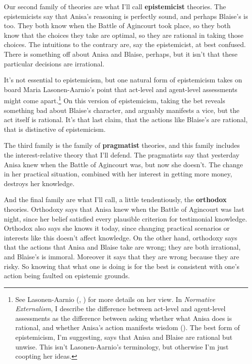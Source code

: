 \documentclass[
  12pt,
  letterpaper,
]{scrbook}
\begin{document}
Our second family of theories are what I'll call \textbf{epistemicist}
theories. The epistemicists say that Anisa's reasoning is perfectly
sound, and perhaps Blaise's is too. They both know when the Battle of
Agincourt took place, so they both know that the choices they take are
optimal, so they are rational in taking those choices. The intuitions to
the contrary are, say the epistemicist, at best confused. There is
something off about Anisa and Blaise, perhaps, but it isn't that these
particular decisions are irrational.

It's not essential to epistemicism, but one natural form of epistemicism
takes on board Maria Lasonen-Aarnio's point that act-level and
agent-level assessments might come apart.\footnote{See Lasonen-Aarnio
  (,
  ) for more details on her view.
  In \emph{Normative Externalism}, I describe the difference between
  act-level and agent-level assessments as the difference between asking
  whether what Anisa does is rational, and whether Anisa's action
  manifests wisdom (). The best form of epistemicism, I'm suggesting, says that
  Anisa and Blaise are rational but unwise. This isn't Lasonen-Aarnio's
  terminology, but otherwise I'm just coopting her ideas.} On this
version of epistemicism, taking the bet reveals something bad about
Blaise's character, and arguably manifests a vice, but the act itself is
rational. It's that last claim, that the actions like Blaise's are
rational, that is distinctive of epistemicism.

The third family is the family of \textbf{pragmatist} theories, and this
family includes the interest-relative theory that I'll defend. The
pragmatists say that yesterday Anisa knew when the Battle of Agincourt
was, but now she doesn't. The change in her practical situation,
combined with her interest in getting more money, destroys her
knowledge.

And the final family are what I'll call, a little tendentiously, the
\textbf{orthodox} theories. Orthodoxy says that Anisa knew when the
Battle of Agincourt was last night, since her belief satisfied every
plausible criterion for testimonial knowledge. Orthodox also says she
knows it today, since changing practical scenarios or interests like
this doesn't affect knowledge. On the other hand, orthodoxy says that
the actions that Anisa and Blaise take are wrong; they are both
irrational, and Blaise's is immoral. Moreover it says that they are
wrong because they are risky. So knowing that what one is doing is for
the best is consistent with one's action being faulted on epistemic
grounds.
\end{document}
